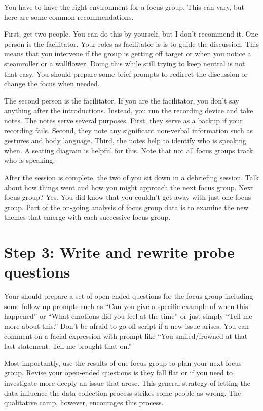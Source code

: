 \documentclass[
  letterpaper,
  DIV=11,
  numbers=noendperiod]{scrreprt}
\begin{document}
\begin{tcolorbox}
You have to have the right environment for a focus group. This can vary,
but here are some common recommendations.

First, get two people. You can do this by yourself, but I don't
recommend it. One person is the facilitator. Your roles as facilitator
is is to guide the discussion. This means that you intervene if the
group is getting off target or when you notice a steamroller or a
wallflower. Doing this while still trying to keep neutral is not that
easy. You should prepare some brief prompts to redirect the discussion
or change the focus when needed.

The second person is the facilitator. If you are the facilitator, you
don't say anything after the introductions. Instead, you run the
recording device and take notes. The notes serve several purposes.
First, they serve as a backup if your recording fails. Second, they note
any significant non-verbal information such as gestures and body
language. Third, the notes help to identify who is speaking when. A
seating diagram is helpful for this. Note that not all focus groups
track who is speaking.

After the session is complete, the two of you sit down in a debriefing
session. Talk about how things went and how you might approach the next
focus group. Next focus group? Yes. You did know that you couldn't get
away with just one focus group. Part of the on-going analysis of focus
group data is to examine the new themes that emerge with each successive
focus group.

\section{Step 3: Write and rewrite probe
questions}\label{step-3-write-and-rewrite-probe-questions}

Your should prepare a set of open-ended questions for the focus group
including some follow-up prompts such as ``Can you give a specific
example of when this happened'' or ``What emotions did you feel at the
time'' or just simply ``Tell me more about this.'' Don't be afraid to go
off script if a new issue arises. You can comment on a facial expression
with prompt like ``You smiled/frowned at that last statement. Tell me
brought that on.''

Most importantly, use the results of one focus group to plan your next
focus group. Revise your open-ended questions is they fall flat or if
you need to investigate more deeply an issue that arose. This general
strategy of letting the data influence the data collection process
strikes some people as wrong. The qualitative camp, however, encourages
this process.


\end{tcolorbox}
\end{document}
